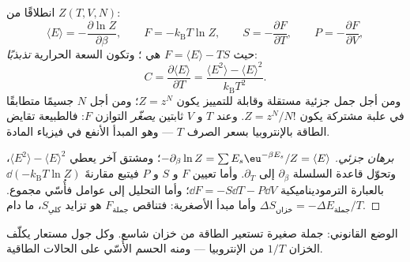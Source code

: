 \begin{proposition}[الآلة]\label{prop:b3:canonical-ensemble:machine}
انطلاقًا من $Z(T, V, N)$:
\[
\langle E\rangle = -\frac{\partial\ln Z}{\partial\beta} , \qquad
F = -k_{\text{B}}T\ln Z , \qquad
S = -\frac{\partial F}{\partial T} , \qquad
P = -\frac{\partial F}{\partial V} ,
\]
حيث $F = \langle E\rangle - TS$ هي \emph{}؛ وتكون
السعة الحرارية \emph{تذبذبًا}:
\[
C = \frac{\partial\langle E\rangle}{\partial T}
 = \frac{\langle E^2\rangle - \langle E\rangle^2}
{k_{\text{B}}T^2} .
\]
ومن أجل جمل جزئية مستقلة وقابلة للتمييز يكون $Z = z^N$؛ ومن أجل $N$
جسيمًا متطابقًا في علبة مشتركة يكون $Z = z^N/N!$. وعند $T$ و
$V$ ثابتين \emph{يصغّر} التوازن $F$: فالطبيعة تقايض الطاقة
بالإنتروبيا بسعر الصرف $T$ --- وهو المبدأ الأنفع
في فيزياء المادة.
\end{proposition}

\begin{proof}[برهان جزئي]
$-\partial_\beta\ln Z = \sum E_s\eu^{-\beta E_s}/Z = \langle
E\rangle$؛ ومشتق آخر يعطي $\langle E^2\rangle - \langle
E\rangle^2$، وتحوّل قاعدة السلسلة $\partial_\beta$ إلى
$\partial_T$. وأما تعيين $F$ و $S$ و $P$ فيتبع
مقارنةَ $\dd(-k_{\text{B}}T\ln Z)$ بالعبارة الترموديناميكية
$\dd F = -S\dd T - P\dd V$؛ وأما التحليل إلى عوامل فأُسّي
مجموع. وأما مبدأ الأصغرية: فتناقص $F_{\text{جملة}}$ هو
تزايد $S_{\text{كلي}}$، ما دام $\Delta S_{\text{خزان}} =
-\Delta E_{\text{جملة}}/T$.
\end{proof}

\begin{omfigure}

{\small الوضع القانوني: جملة صغيرة تستعير الطاقة من
خزان شاسع. وكل جول مستعار يكلّف الخزان $1/T$ من
الإنتروبيا --- ومنه الحسم الأُسّي على الحالات الطاقية.}
\end{omfigure}

